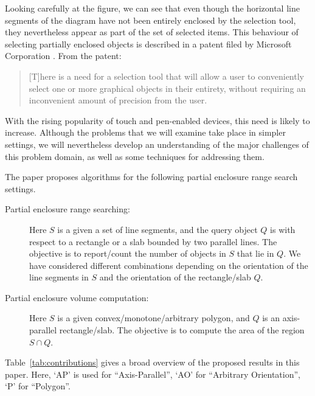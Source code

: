 Looking carefully at the figure, we can see that even though the horizontal line segments of the diagram have not been entirely enclosed by the selection tool, they nevertheless appear as part of the set of selected items.
This behaviour of selecting partially enclosed objects is described in a patent filed by Microsoft Corporation \cite{lassoselect}. 
From the patent:

\begin{quote}
[T]here is a need for a selection tool that will allow a user to conveniently select one or more graphical objects in their entirety, without requiring an inconvenient amount of precision from the user.
\end{quote}

\noindent With the rising popularity of touch and pen-enabled devices, this need is likely to increase.  
Although the problems that we will examine take place in simpler settings, we will nevertheless develop an understanding of the major challenges of this problem domain, as well as some techniques for addressing them.



The paper proposes algorithms for the following partial enclosure range search settings.  
\begin{description}
\item[Partial enclosure range searching:] Here $S$ is a given a set of line segments, 
and the query object $Q$ is with respect to a rectangle or a slab bounded by two parallel lines. The objective is to report/count the number of objects in $S$ that lie in $Q$. We have considered different combinations depending on the orientation of the 
line segments in $S$ and the orientation of the rectangle/slab $Q$.
\item[Partial enclosure volume computation:] Here $S$ is a given convex/monotone/arbitrary polygon, and $Q$ is an axis-parallel rectangle/slab. The objective is to compute the area of the region $S\cap Q$. 
\end{description}

Table~\ref{tab:contributions} gives a broad overview of the proposed results in this paper. 
Here, `AP' is used for ``Axis-Parallel'', `AO' for ``Arbitrary Orientation'', `P' for ``Polygon''.

